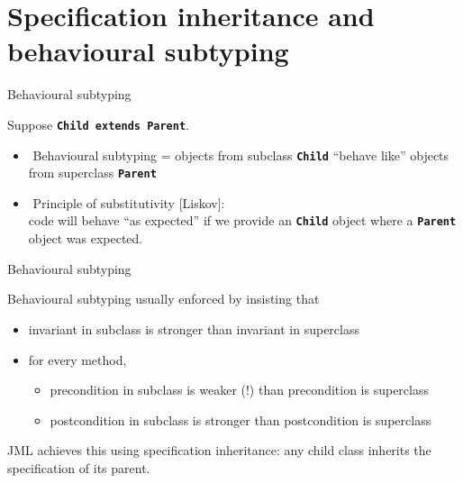 \documentclass[
pdf,
nocolorBG,
slideColor,
erik,
]{prosper}
\newcommand{\code}[1]{{\rm \texttt{\textbf{\small #1}}}}
\newif\ifignore
\begin{document}
\ifignore 
\part{{\Large \red Specification inheritance and behavioural subtyping }}

\begin{slide}{Behavioural subtyping}
\vspace*{-4ex}

Suppose \code{Child extends Parent}.

\begin{itemize}
\item $\!$ {\green Behavioural subtyping} =
objects from subclass \code{Child} ``behave like'' 
objects from superclass \code{Parent}
\item $\!$ {\green Principle of substitutivity} [Liskov]:\\
code will behave ``as expected'' if we provide an
\code{Child} object where a \code{Parent} object was expected. 
\end{itemize}

\end{slide}

\begin{slide}{Behavioural subtyping}
\vspace*{-4ex}

Behavioural subtyping usually enforced by insisting that

\begin{itemize}
\item 
invariant in subclass is {\green stronger} than invariant in superclass
\item
for every method,
\begin{itemize}
\item 
precondition in subclass is {\blue weaker} (!) than precondition is superclass
\item 
postcondition in subclass is {\green stronger} than postcondition is superclass
\end{itemize}
\end{itemize}

JML achieves this using {\green specification inheritance}:
any child class {\green inherits} the specification of its parent.

\end{slide}
\end{document}
